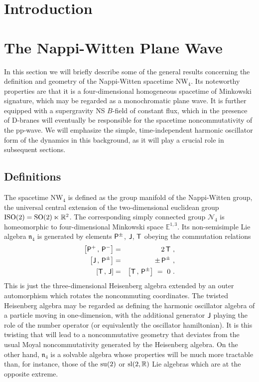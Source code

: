\documentclass[11pt,a4paper]{article}
\def\P{{\sf P}}
\def\T{{\sf T}}
\def\J{{\sf J}}
\newcommand{\newsection}{\setcounter{equation}{0}\section}
\newcommand{\real}{{\mathbb R}} %
\newcommand{\eucl}{{\mathbb E}}
\def\nn{\nonumber}
\def\bea{\begin{eqnarray}}
\def\eea{\end{eqnarray}}
\begin{document}
\newsection{Introduction \label{Intro}}

\newsection{The Nappi-Witten Plane Wave \label{NWPW}}

In this section we will briefly describe some of the general results
concerning the definition and geometry of the Nappi-Witten spacetime
NW$_4$. Its noteworthy properties are that it is a four-dimensional
homogeneous spacetime of Minkowski signature, which may be regarded as
a monochromatic plane wave. It is further equipped with a supergravity
NS $B$-field of constant flux, which in the presence of D-branes will
eventually be responsible for the spacetime noncommutativity of the
pp-wave. We will emphasize the simple, time-independent harmonic
oscillator form of the dynamics in this background, as it will play a
crucial role in subsequent sections.

\subsection{Definitions \label{Defs}}

The spacetime NW$_4$ is defined as the group manifold of
the Nappi-Witten group, the universal central extension of the
two-dimensional euclidean group ${\rm ISO}(2)={\rm
  SO}(2)\ltimes\real^2$. The corresponding simply connected group
$\mathcal N_4$ is homeomorphic to four-dimensional Minkowski space
$\eucl^{1,3}$. Its non-semisimple Lie algebra $\mathfrak n_4$ is
generated by elements $\P^\pm$, $\J$, $\T$ obeying the commutation
relations
\bea
\left[\P^+\,,\,\P^-\right]&=&2\,\T \ , \nn\\
\left[\J\,,\,\P^\pm\right]&=&\pm\,\P^\pm \ , \nn\\
\left[\T\,,\,\J\right]&=&\left[\T\,,\,\P^\pm\right]~=~0 \ .
\label{NW4algdef}\eea
This is just the three-dimensional Heisenberg algebra extended by an
outer automorphism which rotates the noncommuting coordinates. The
twisted Heisenberg algebra
may be regarded as defining the harmonic oscillator algebra of a
particle moving in one-dimension, with the additional generator $\J$
playing the role of the number operator (or equivalently the
oscillator hamiltonian). It is this twisting that will
lead to a noncommutative geometry that deviates from the usual Moyal
noncommutativity generated by the Heisenberg algebra. On the other
hand, $\mathfrak{n}_4$ is a solvable algebra whose properties will be
much more tractable than, for instance, those of the
${\rm su}(2)$ or ${\rm sl}(2,\real)$ Lie algebras which are
at the opposite extreme.
\end{document}
